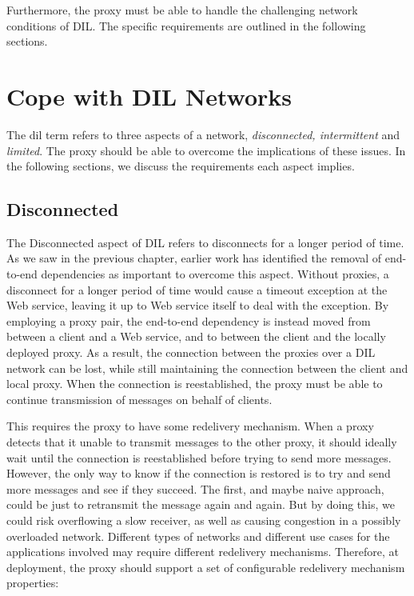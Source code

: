 Furthermore, the proxy must be able to handle the challenging network conditions
of DIL. The specific requirements are outlined in the following sections.

\section{Cope with DIL Networks}

The \gls{dil} term refers to three aspects of a network, \textit{disconnected,
intermittent} and \textit{limited}. The proxy should be able to overcome the
implications of these issues. In the following sections, we discuss the
requirements each aspect implies.

\subsection{Disconnected}

The Disconnected aspect of DIL refers to disconnects for a longer period of
time. As we saw in the previous chapter, earlier work has identified the removal
of end-to-end dependencies as important to overcome this aspect. Without
proxies, a disconnect for a longer period of time would cause a timeout
exception at the Web service, leaving it up to Web service itself to deal with
the exception. By employing a proxy pair, the end-to-end dependency is instead
moved from between a client and a Web service, and to between the client and the
locally deployed proxy. As a result, the connection between the proxies over a
DIL network can be lost, while still maintaining the connection between the
client and local proxy. When the connection is reestablished, the proxy must be
able to continue transmission of messages on behalf of clients.

This requires the proxy to have some redelivery mechanism. When a proxy detects
that it unable to transmit messages to the other proxy, it should ideally wait
until the connection is reestablished before trying to send more messages.
However, the only way to know if the connection is restored is to try and send
more messages and see if they succeed. The first, and maybe naive approach,
could be just to retransmit the message again and again. But by doing this, we
could risk overflowing a slow receiver, as well as causing congestion in a
possibly overloaded network. Different types of networks and different use cases
for the applications involved may require different redelivery mechanisms.
Therefore, at deployment, the proxy should support a set of configurable
redelivery mechanism properties:

